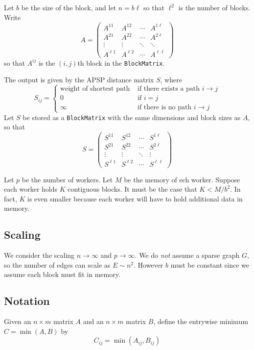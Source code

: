 \documentclass{article} %
\begin{document}
Let $b$ be the size of the block, and let $n = b\ell$ so that $\ell^2$
is the number of blocks.  Write
\[
A = \begin{pmatrix}
A^{11} & A^{12} & \cdots & A^{1\ell}\\
A^{21} & A^{22} & \cdots & A^{2\ell}\\
\vdots & \vdots & \ddots & \ddots\\
A^{\ell 1} & A^{\ell 2} & \cdots & A^{\ell \ell}
\end{pmatrix}
\]
so that $A^{ij}$ is the $(i,j)$th block in the {\tt BlockMatrix}.

The output is given by the APSP distance matrix $S$, where
\[
S_{ij} = 
\begin{cases}
\text{weight of shortest path} &\text{ if there exists a path } i \to j\\
0 &\text{ if } i = j\\
\infty &\text{ if there is no path } i \to j
\end{cases}
\]
Let $S$ be stored as a {\tt BlockMatrix} with the same dimensions and
block sizes as $A$, so that
\[
S = \begin{pmatrix}
S^{11} & S^{12} & \cdots & S^{1\ell}\\
S^{21} & S^{22} & \cdots & S^{2\ell}\\
\vdots & \vdots & \ddots & \vdots\\
S^{\ell 1} & S^{\ell 2} & \cdots & S^{\ell \ell}
\end{pmatrix}
\]

Let $p$ be the number of workers.  Let $M$ be the memory of ech
worker.  Suppose each worker holds $K$ contiguous blocks.  It must be
the case that $K < M/b^2$.  In fact, $K$ is even smaller because each
worker will have to hold additional data in memory.

\subsection{Scaling}

We consider the scaling $n \to \infty$ and $p \to \infty$.  We do
\emph{not} assume a sparse graph $G$, so the number of edges can scale
as $E \sim n^2$.  However $b$ must be constant since we assume each
block must fit in memory.

\subsection{Notation}

Given an $n \times m$ matrix $A$ and an $n \times m$ matrix $B$, define the entrywise minimum $C = \min(A, B)$ by
\[
C_{ij} = \min(A_{ij}, B_{ij})
\]
\end{document}
